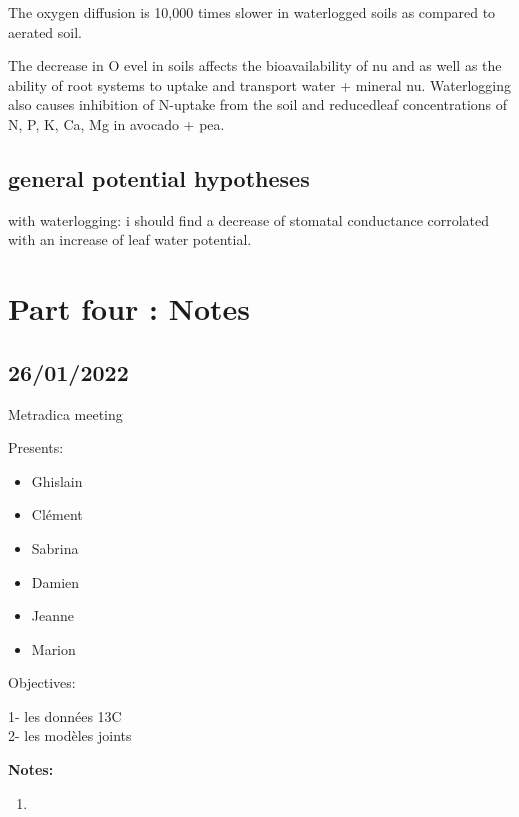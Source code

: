 \documentclass[
]{book}
\providecommand{\tightlist}{%
  \setlength{\itemsep}{0pt}\setlength{\parskip}{0pt}}
\begin{document}
The oxygen diffusion is 10,000 times slower in waterlogged soils as compared to aerated soil.

The decrease in O evel in soils affects the bioavailability of nu and as well as the ability of root systems to uptake and transport water + mineral nu. Waterlogging also causes inhibition of N-uptake from the soil and reducedleaf concentrations of N, P, K, Ca, Mg in avocado + pea.

\hypertarget{general-potential-hypotheses}{%
\chapter{general potential hypotheses}\label{general-potential-hypotheses}}

with waterlogging: i should find a decrease of stomatal conductance corrolated with an increase of leaf water potential.

\hypertarget{part-part-four-notes}{%
\part{Part four : Notes}\label{part-part-four-notes}}

\hypertarget{section}{%
\chapter{26/01/2022}\label{section}}

Metradica meeting

Presents:

\begin{itemize}
\tightlist
\item
  Ghislain
\item
  Clément\\
\item
  Sabrina
\item
  Damien\\
\item
  Jeanne
\item
  Marion
\end{itemize}

Objectives:

1- les données 13C\\
2- les modèles joints

\textbf{Notes:}

\begin{enumerate}
\def\labelenumi{(\arabic{enumi})}
\item
\end{enumerate}
\end{document}
